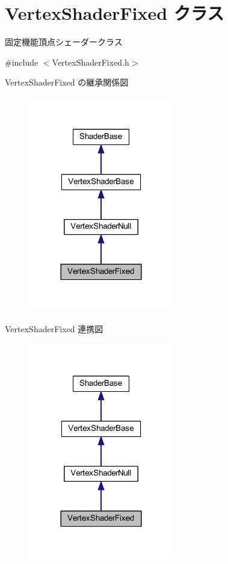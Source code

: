 \hypertarget{class_vertex_shader_fixed}{}\section{Vertex\+Shader\+Fixed クラス}
\label{class_vertex_shader_fixed}


固定機能頂点シェーダークラス  




{\ttfamily \#include $<$Vertex\+Shader\+Fixed.\+h$>$}



Vertex\+Shader\+Fixed の継承関係図\nopagebreak
\begin{figure}[H]
\begin{center}
\leavevmode
\includegraphics[width=180pt]{class_vertex_shader_fixed__inherit__graph}
\end{center}
\end{figure}


Vertex\+Shader\+Fixed 連携図\nopagebreak
\begin{figure}[H]
\begin{center}
\leavevmode
\includegraphics[width=180pt]{class_vertex_shader_fixed__coll__graph}
\end{center}
\end{figure}
